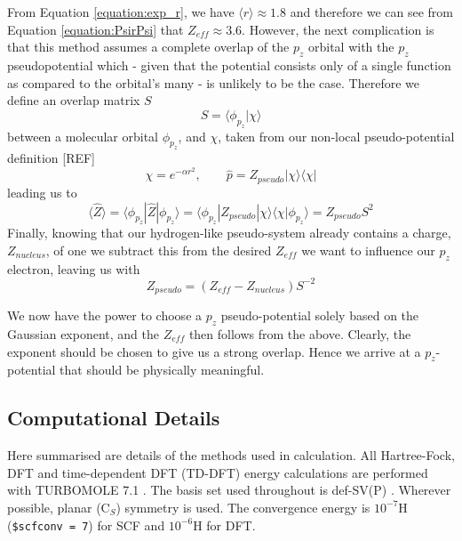 \documentclass[journal=jctcce,manuscript=article]{achemso}
\begin{document}
From Equation \ref{equation:exp_r}, we have \( \langle r \rangle \approx 1.8\) and therefore we can see from Equation \ref{equation:PsirPsi} that \(Z_{eff} \approx 3.6\). However, the next complication is that this method assumes a complete overlap of the \(p_{z}\) orbital with the \(p_{z}\) pseudopotential which - given that the potential consists only of a single function as compared to the orbital's many - is unlikely to be the case. Therefore we define an overlap matrix \(S\)
\begin{equation}
S = \langle \phi_{p_{z}} | \chi \rangle
\end{equation}
between a molecular orbital \(\phi_{p_{z}}\), and \(\chi\), taken from our non-local pseudo-potential definition [REF]
\begin{equation}
\chi = e^{-\alpha r^{2}},\qquad \widehat{p} = Z_{pseudo} | \chi \rangle \langle \chi |
\end{equation}
leading us to
\begin{equation}
\langle \widehat{Z} \rangle = \langle \phi_{p_{z}} | \widehat{Z} | \phi_{p_{z}} \rangle = \langle \phi_{p_{z}} | Z_{pseudo} | \chi \rangle \langle \chi | \phi_{p_{z}} \rangle = Z_{pseudo} S^{2}
\end{equation}
Finally, knowing that our hydrogen-like pseudo-system already contains a charge, \(Z_{nucleus}\), of one we subtract this from the desired \(Z_{eff}\) we want to influence our \(p_{z}\) electron, leaving us with
\begin{equation}
Z_{pseudo} = (Z_{eff} - Z_{nucleus})S^{-2}
\end{equation}

We now have the power to choose a \(p_{z}\) pseudo-potential solely based on the Gaussian exponent, and the \(Z_{eff}\) then follows from the above. Clearly, the exponent should be chosen to give us a strong overlap. Hence we arrive at a \(p_{z}\)-potential that should be physically meaningful. 

\subsection{Computational Details}

Here summarised are details of the methods used in calculation. All Hartree-Fock, DFT and time-dependent DFT (TD-DFT) energy calculations are performed with TURBOMOLE 7.1 \cite{TURBOMOLE}. The basis set used throughout is def-SV(P) \cite{defsvp}. Wherever possible, planar (C\(_{S}\)) symmetry is used. The convergence energy is \(10^{-7}\)H (\texttt{\$scfconv = 7}) for SCF and \(10^{-6}\)H for DFT.
\end{document}
